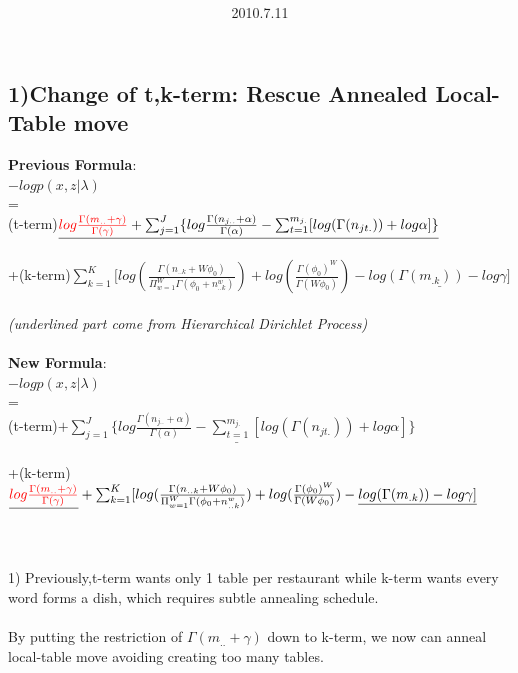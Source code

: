 \documentclass{article}
\title{\vspace{0.3in}\textmd{\textbf{\hmwkTitle}}}
\date{2010.7.11}
\author{\textbf{\hmwkAuthorName}}
\begin{document}
\begin{spacing}{1.1}
\maketitle
\section{1)Change of t,k-term: Rescue Annealed Local-Table move}
{\bf Previous Formula}:\\
$-log p(x,z|\lambda)$\\ =\\
(t-term)$ \underline{{\color{red}log \frac{\Gamma(m_{..}+\gamma)}{\Gamma(\gamma)}}+\sum_{j=1}^{J} \{log \frac{\Gamma(n_{j..}+\alpha)}{\Gamma(\alpha)}-\sum_{t=1}^{m_{j.}}[log(\Gamma(n_{jt.}))+log \alpha
]\}}$\\ \\
+(k-term)$ \sum_{k=1}^{K} [log(\frac{\Gamma(n_{..k}+W\phi_{0})}{\Pi_{w=1}^{W}\Gamma(\phi_{0}+n_{..k}^{w})})+log(\frac{\Gamma(\phi_{0})^{W}}{\Gamma(W\phi_{0})})
-\underline{log(\Gamma(m_{.k}))-log \gamma]}$\\ \\
\emph{{\small (underlined part come from Hierarchical Dirichlet Process)}}\\ \\ 
{\bf New Formula}:\\
$-log p(x,z|\lambda)$\\ =\\
(t-term)$ \underline{+\sum_{j=1}^{J} \{log \frac{\Gamma(n_{j..}+\alpha)}{\Gamma(\alpha)}-\sum_{t=1}^{m_{j.}}[log(\Gamma(n_{jt.}))+log \alpha
]\}}$\\ \\
+(k-term)$ \underline{{\color{red}log \frac{\Gamma(m_{..}+\gamma)}{\Gamma(\gamma)}}}+\sum_{k=1}^{K} [log(\frac{\Gamma(n_{..k}+W\phi_{0})}{\Pi_{w=1}^{W}\Gamma(\phi_{0}+n_{..k}^{w})})+log(\frac{\Gamma(\phi_{0})^{W}}{\Gamma(W\phi_{0})})
-\underline{log(\Gamma(m_{.k}))-log \gamma]}$\\ \\ \\ \\
1) Previously,t-term wants only 1 table per restaurant while k-term wants every word forms a dish, which requires subtle annealing schedule.\\ \\
By putting the restriction of $\Gamma(m_{..}+\gamma)$ down to k-term, we now can anneal local-table move avoiding creating too many tables.\\ \\

\end{spacing}
\end{document}
